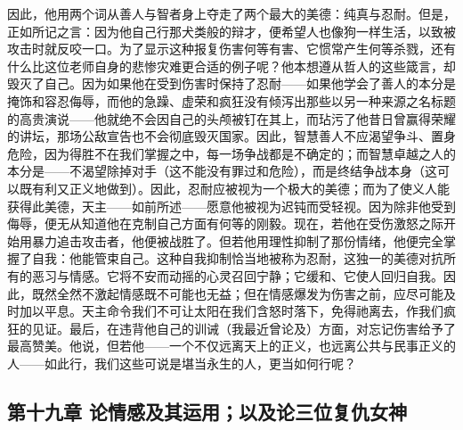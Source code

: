 因此，他用两个词从善人与智者身上夺走了两个最大的美德：纯真与忍耐。但是，正如所记之言：因为他自己行那犬类般的辩才，便希望人也像狗一样生活，以致被攻击时就反咬一口。为了显示这种报复伤害何等有害、它惯常产生何等杀戮，还有什么比这位老师自身的悲惨灾难更合适的例子呢？他本想遵从哲人的这些箴言，却毁灭了自己。因为如果他在受到伤害时保持了忍耐——如果他学会了善人的本分是掩饰和容忍侮辱，而他的急躁、虚荣和疯狂没有倾泻出那些以另一种来源之名标题的高贵演说——他就绝不会因自己的头颅被钉在其上，而玷污了他昔日曾赢得荣耀的讲坛，那场公敌宣告也不会彻底毁灭国家。因此，智慧善人不应渴望争斗、置身危险，因为得胜不在我们掌握之中，每一场争战都是不确定的；而智慧卓越之人的本分是——不渴望除掉对手（这不能没有罪过和危险），而是终结争战本身（这可以既有利又正义地做到）。因此，忍耐应被视为一个极大的美德；而为了使义人能获得此美德，天主——如前所述——愿意他被视为迟钝而受轻视。因为除非他受到侮辱，便无从知道他在克制自己方面有何等的刚毅。现在，若他在受伤激怒之际开始用暴力追击攻击者，他便被战胜了。但若他用理性抑制了那份情绪，他便完全掌握了自我：他能管束自己。这种自我抑制恰当地被称为忍耐，这独一的美德对抗所有的恶习与情感。它将不安而动摇的心灵召回宁静；它缓和、它使人回归自我。因此，既然全然不激起情感既不可能也无益；但在情感爆发为伤害之前，应尽可能及时加以平息。天主命令我们不可让太阳在我们含怒时落下，免得祂离去，作我们疯狂的见证。最后，在违背他自己的训诫（我最近曾论及）方面，对忘记伤害给予了最高赞美。他说，但若他——一个不仅远离天上的正义，也远离公共与民事正义的人——如此行，我们这些可说是堪当永生的人，更当如何行呢？\par


\subsection{第十九章 论情感及其运用；以及论三位复仇女神}


